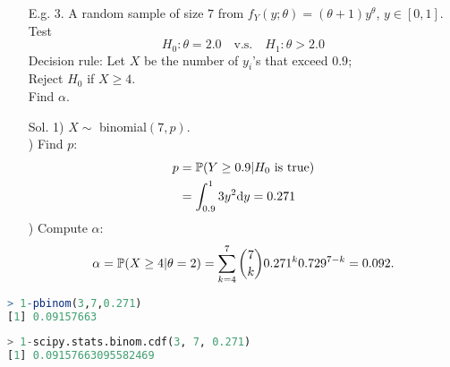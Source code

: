 \begin{frame}[fragile]
\begin{enumerate}
	\item[E.g. 3.] A random sample of size $7$ from $f_Y(y;\theta)=(\theta+1)y^\theta$, $y\in[0,1]$.
		Test
		\[
			 H_0:\theta=2.0 \quad\text{v.s.}\quad H_1: \theta>2.0
		\]
		Decision rule: Let $X$ be the number of $y_i$'s that exceed $0.9$; \\
    \phantom{Decision rule:} Reject $H_0$ if $X\ge 4$. \\
		Find $\alpha$.
		\pause
    \bigskip
	\item[Sol.] 1) $X\sim$ binomial$(7,p)$. \\ ) Find $p$:
		\begin{align*}
			p&=\mathbb{P}(Y\ge 0.9| \text{$H_0$ is true}) \\
			 &= \int_{0.9}^1 3y^2 \mathrm{d} y = 0.271
		\end{align*}) Compute $\alpha$:
		\[
			\alpha=\mathbb{P}(X\ge 4|\theta=2) = \sum_{k=4}^7 {7\choose k} 0.271^k 0.729^{7-k}
			=0.092.
		\]
    \myEnd
\end{enumerate}
\begin{center}
\begin{minipage}{0.3\textwidth}
\begin{center}
\begin{lstlisting}[language=R]
> 1-pbinom(3,7,0.271)
[1] 0.09157663
\end{lstlisting}
\end{center}
\end{minipage}
\quad
\begin{minipage}{0.5\textwidth}
\begin{center}
\begin{lstlisting}[language=Python]
> 1-scipy.stats.binom.cdf(3, 7, 0.271)
[1] 0.09157663095582469
\end{lstlisting}
\end{center}
\end{minipage}
\end{center}
\end{frame}


